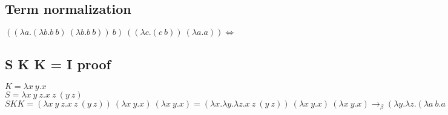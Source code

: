 \documentclass[12 pt, a4paper]{article}
\begin{document}
\subsection*{Term normalization}
\( ((\lambda a .(\lambda b . b\ b)\ (\lambda b . b\ b))\ b)\ ((\lambda c .(c\ b))\ (\lambda a.a)) \Leftrightarrow \)
\subsection*{S K K = I proof}
$K = \lambda x\ y.x$\\
$S = \lambda x\ y\ z.x\ z\ (y\ z)$\\
$S K K = (\lambda x\ y\ z.x\ z\ (y\ z))\ (\lambda x\ y.x)\ (\lambda x\ y.x) = (\lambda x.\lambda y.\lambda z.x\ z\ (y\ z))\ (\lambda x\ y.x)\ (\lambda x\ y.x) \rightarrow_\beta (\lambda y.\lambda z.(\lambda a\ b.a)\ z\ (y\ z))\ (\lambda x\ y.x)\rightarrow_\beta \lambda z.(\lambda a\ b.a)\ z\ ((\lambda a\ b.a)\ z) = \lambda z.(\lambda a.\lambda b.a)\ z\ ((\lambda a.\lambda b.a)\ z) \rightarrow_\beta  \lambda z.\lambda b.z\ ((\lambda a.\lambda b.a)\ z \rightarrow_\beta  \lambda z.\lambda b.z\ \lambda b.z \rightarrow_\beta  \lambda z.z = I$ 
\end{document}
